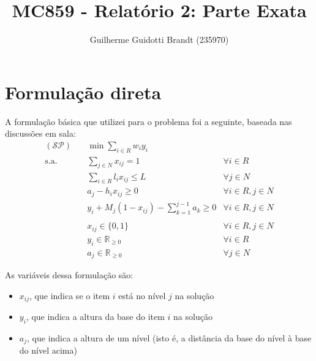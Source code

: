 \documentclass{article}
\title{MC859 - Relatório 2: Parte Exata}
\author{Guilherme Guidotti Brandt (235970)}
\date{}
\begin{document}
\maketitle

\section{Formulação direta}

A formulação básica que utilizei para o problema foi a seguinte, baseada nas discussões em sala:
\begin{align}
    (\mathcal{SP})\quad
     & \min \sum_{i \in R} w_i y_i\nonumber                                                         \\
    \text{s.a.}\quad
     & \sum_{j \in N} x_{ij} = 1                                & \forall i \in R                   \\
     & \sum_{i \in R} l_i x_{ij} \leq L                         & \forall j \in N                   \\
     & a_j - h_i x_{ij} \geq 0                                  & \forall i \in R, j \in N          \\
     & y_i + M_j (1 - x_{ij}) - \sum_{k = 1}^{j - 1} a_k \geq 0 & \forall i \in R, j \in N          \\
    \nonumber                                                                                       \\
     & x_{ij} \in \{0, 1\}                                      & \forall i \in R, j \in N\nonumber \\
     & y_i \in \mathbb{R}_{\geq 0}                              & \forall i \in R\nonumber          \\
     & a_j \in \mathbb{R}_{\geq 0}                              & \forall j \in N\nonumber
\end{align}

As variáveis dessa formulação são:
\begin{itemize}
    \item $x_{ij}$, que indica se o item $i$ está no nível $j$ na solução
    \item $y_i$, que indica a altura da base do item $i$ na solução
    \item $a_j$, que indica a altura de um nível (isto é, a distância da base do nível à base do nível acima)
\end{itemize}
\end{document}
